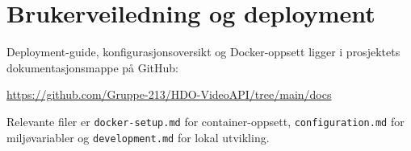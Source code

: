 \chapter{Brukerveiledning og deployment}
\label{app:brukerveiledning}

Deployment-guide, konfigurasjonsoversikt og Docker-oppsett 
ligger i prosjektets dokumentasjonsmappe på GitHub:

\url{https://github.com/Gruppe-213/HDO-VideoAPI/tree/main/docs}

Relevante filer er \texttt{docker-setup.md} for 
container-oppsett, \texttt{configuration.md} for 
miljøvariabler og \texttt{development.md} for lokal utvikling.